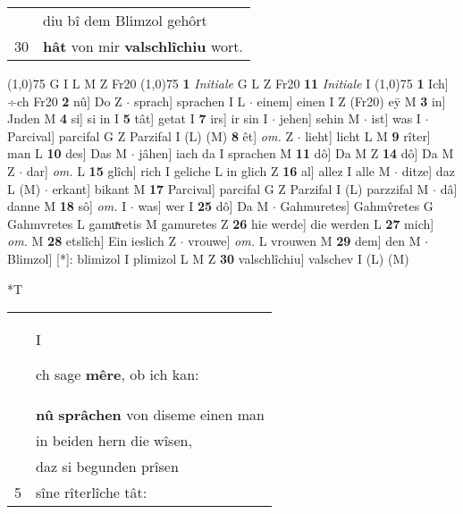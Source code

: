 \documentclass[8pt,a4paper,notitlepage]{article}
\begin{document}
\begin{table}[ht]
\begin{minipage}[t]{0.5\linewidth}
\begin{tabular}{rl}
 & diu bî dem Blimzol gehôrt\\ 
30 & \textbf{hât} von mir \textbf{valschlîchiu} wort.\\ 
\end{tabular}
\scriptsize
\line(1,0){75} \newline
G I L M Z Fr20 \newline
\line(1,0){75} \newline
\textbf{1} \textit{Initiale} G L Z Fr20  \textbf{11} \textit{Initiale} I  \newline
\line(1,0){75} \newline
\textbf{1} Ich] ÷ch Fr20 \textbf{2} nû] Do Z  $\cdot$ sprach] sprachen I L  $\cdot$ einem] einen I Z (Fr20) eȳ M \textbf{3} in] Jnden M \textbf{4} si] si in I \textbf{5} tât] getat I \textbf{7} irs] ir sin I  $\cdot$ jehen] sehin M  $\cdot$ ist] was I  $\cdot$ Parcival] parcifal G Z Parzifal I (L) (M) \textbf{8} êt] \textit{om.} Z  $\cdot$ lieht] licht L M \textbf{9} rîter] man L \textbf{10} des] Das M  $\cdot$ jâhen] iach da I sprachen M \textbf{11} dô] Da M Z \textbf{14} dô] Da M Z  $\cdot$ dar] \textit{om.} L \textbf{15} glîch] rich I geliche L in glich Z \textbf{16} al] allez I alle M  $\cdot$ ditze] daz L (M)  $\cdot$ erkant] bikant M \textbf{17} Parcival] parcifal G Z Parzifal I (L) parzzifal M  $\cdot$ dâ] danne M \textbf{18} sô] \textit{om.} I  $\cdot$ was] wer I \textbf{25} dô] Da M  $\cdot$ Gahmuretes] Gahmv̂retes G Gahmvretes L gamuͯretis M gamuretes Z \textbf{26} hie werde] die werden L \textbf{27} mich] \textit{om.} M \textbf{28} etslîch] Ein ieslich Z  $\cdot$ vrouwe] \textit{om.} L vrouwen M \textbf{29} dem] den M  $\cdot$ Blimzol] [*]: blimizol I plimizol L M Z \textbf{30} valschlîchiu] valschev I (L) (M) \newline
\end{minipage}
\hspace{0.5cm}
\begin{minipage}[t]{0.5\linewidth}
\small
\begin{center}*T
\end{center}
\begin{tabular}{rl}
 & \begin{large}I\end{large}ch sage \textbf{mêre}, ob ich kan:\\ 
 & \textbf{nû} \textbf{sprâchen} von diseme einen man\\ 
 & in beiden hern die wîsen,\\ 
 & daz si begunden prîsen\\ 
5 & sîne rîterlîche tât:\\ 

\end{tabular}
\end{minipage}
\end{table}
\end{document}
